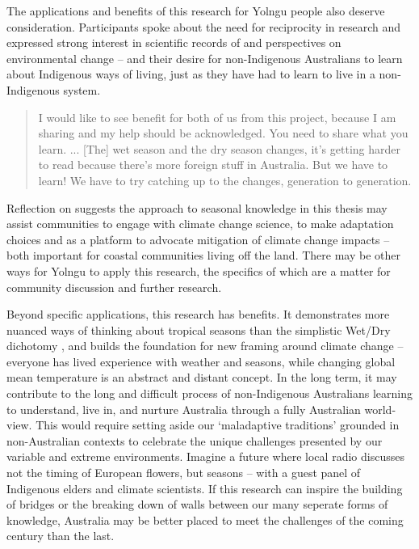 The applications and benefits of this research for Yolngu people also deserve
consideration.  Participants spoke about the need for reciprocity in research
and expressed strong interest in scientific records of and perspectives on
environmental change -- and their desire for non-Indigenous Australians to
learn about Indigenous ways of living, just as they have had to learn to
live in a non-Indigenous system.
\begin{quote}
    I would like to see benefit for both of us from this project, because I am
    sharing and my help should be acknowledged.  You need to share what you learn. ...
    [The] wet season and the dry season changes, it's getting harder to read
    because there's more foreign stuff in Australia.  But we have to learn!
    We have to try catching up to the changes, generation to generation.
\end{quote}
Reflection on \citet{petheram2010} suggests the approach to seasonal knowledge in this thesis
may assist communities to engage with climate change science, to make
adaptation choices and as a platform to advocate mitigation of climate change impacts -- both
important for coastal communities living off the land.  There may be other
ways for Yolngu to apply this research, the specifics of which are a matter for
community discussion and further research.


Beyond specific applications, this research has benefits.  It
demonstrates more nuanced ways of thinking about tropical seasons than the
simplistic Wet/Dry dichotomy \citep{willmett2009}, and builds the foundation
for new framing around climate change -- everyone has lived experience with
weather and seasons, while changing global mean temperature is an abstract and
distant concept.
%
In the long term, it may contribute to the long and difficult process of
non-Indigenous Australians learning to understand, live in, and nurture
Australia through a fully Australian world-view.  This would require setting
aside our `maladaptive traditions' grounded in non-Australian contexts
\citep{flannery1994} to celebrate the unique challenges presented by our variable and extreme
environments.  Imagine a future where local radio discusses not the timing of
European flowers, but seasons -- with a guest panel of Indigenous elders and
climate scientists.
%
If this research can inspire the building of bridges or the breaking down of walls
between our many seperate forms of knowledge, Australia may be better placed
to meet the challenges of the coming century than the last.

